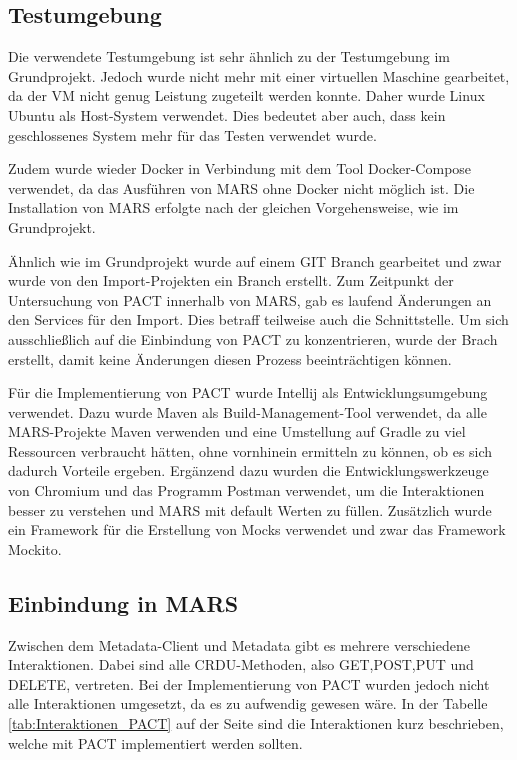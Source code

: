 \documentclass{llncs}
\begin{document}
\subsection{Testumgebung}
Die verwendete Testumgebung ist sehr ähnlich zu der Testumgebung im Grundprojekt. Jedoch wurde nicht mehr mit einer virtuellen Maschine gearbeitet, da der VM nicht genug Leistung zugeteilt werden konnte. Daher wurde Linux Ubuntu als Host-System verwendet. Dies bedeutet aber auch, dass kein geschlossenes System mehr für das Testen verwendet wurde. 

Zudem wurde wieder Docker in Verbindung mit dem Tool Docker-Compose verwendet, da das Ausführen von MARS ohne Docker nicht möglich ist. Die Installation von MARS erfolgte nach der gleichen Vorgehensweise, wie im Grundprojekt. 

Ähnlich wie im Grundprojekt wurde auf einem GIT Branch gearbeitet und zwar wurde von den Import-Projekten ein Branch erstellt. Zum Zeitpunkt der Untersuchung von PACT innerhalb von MARS, gab es laufend Änderungen an den Services für den Import. Dies betraff teilweise auch die Schnittstelle. Um sich ausschließlich auf die Einbindung von PACT zu konzentrieren, wurde der Brach erstellt, damit keine Änderungen diesen Prozess beeinträchtigen können.

Für die Implementierung von PACT wurde Intellij als Entwicklungsumgebung verwendet. Dazu wurde Maven als Build-Management-Tool verwendet, da alle MARS-Projekte Maven verwenden und eine Umstellung auf Gradle zu viel Ressourcen verbraucht hätten, ohne vornhinein ermitteln zu können, ob es sich dadurch Vorteile ergeben. Ergänzend dazu wurden die Entwicklungswerkzeuge von Chromium und das Programm Postman verwendet, um die Interaktionen besser zu verstehen und MARS mit default Werten zu füllen. Zusätzlich wurde ein Framework für die Erstellung von Mocks verwendet und zwar das Framework Mockito.

\subsection{Einbindung in MARS}
Zwischen dem Metadata-Client und Metadata gibt es mehrere verschiedene Interaktionen. Dabei sind alle CRDU-Methoden, also GET,POST,PUT und DELETE, vertreten. Bei der Implementierung von PACT wurden jedoch nicht alle Interaktionen umgesetzt, da es zu aufwendig gewesen wäre. In der Tabelle \ref{tab:Interaktionen_PACT} auf der Seite \pageref{tab:Interaktionen_PACT} sind die Interaktionen kurz beschrieben, welche mit PACT implementiert werden sollten.
\end{document}
